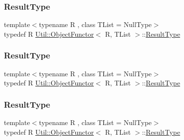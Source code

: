 \mbox{\label{classUtil_1_1ObjectFunctor_a77f816e98108848347d0dfc085090a1c}} 
\subsubsection{\texorpdfstring{ResultType}{ResultType}\hspace{0.1cm}{\footnotesize\ttfamily [1/3]}}
{\footnotesize\ttfamily template$<$typename R , class T\+List  = Null\+Type$>$ \\
typedef R \mbox{\hyperlink{classUtil_1_1ObjectFunctor}{Util\+::\+Object\+Functor}}$<$ R, T\+List $>$\+::\mbox{\hyperlink{classUtil_1_1ObjectFunctor_a77f816e98108848347d0dfc085090a1c}{Result\+Type}}}

\mbox{\label{classUtil_1_1ObjectFunctor_a77f816e98108848347d0dfc085090a1c}} 
\subsubsection{\texorpdfstring{ResultType}{ResultType}\hspace{0.1cm}{\footnotesize\ttfamily [2/3]}}
{\footnotesize\ttfamily template$<$typename R , class T\+List  = Null\+Type$>$ \\
typedef R \mbox{\hyperlink{classUtil_1_1ObjectFunctor}{Util\+::\+Object\+Functor}}$<$ R, T\+List $>$\+::\mbox{\hyperlink{classUtil_1_1ObjectFunctor_a77f816e98108848347d0dfc085090a1c}{Result\+Type}}}

\mbox{\label{classUtil_1_1ObjectFunctor_a77f816e98108848347d0dfc085090a1c}} 
\subsubsection{\texorpdfstring{ResultType}{ResultType}\hspace{0.1cm}{\footnotesize\ttfamily [3/3]}}
{\footnotesize\ttfamily template$<$typename R , class T\+List  = Null\+Type$>$ \\
typedef R \mbox{\hyperlink{classUtil_1_1ObjectFunctor}{Util\+::\+Object\+Functor}}$<$ R, T\+List $>$\+::\mbox{\hyperlink{classUtil_1_1ObjectFunctor_a77f816e98108848347d0dfc085090a1c}{Result\+Type}}}



